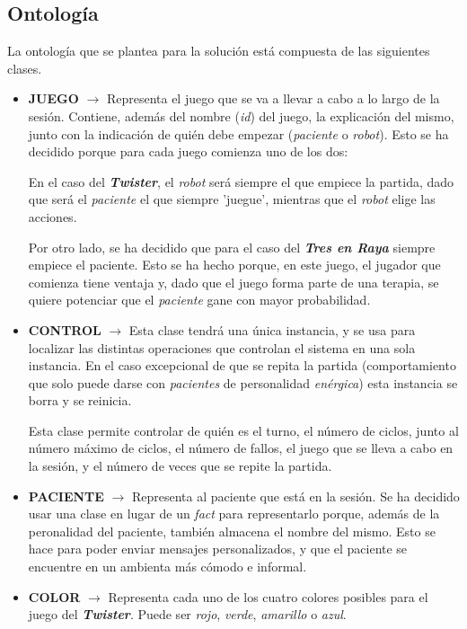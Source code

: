 \documentclass{uc3mpracticas}
\begin{document}
  \subsection{Ontología}

  La ontología que se plantea para la solución está compuesta de las siguientes clases.

  \begin{itemize}
    \item \textbf{JUEGO} $\rightarrow$ Representa el juego que se va a llevar a cabo a lo largo de la sesión. Contiene, además del nombre (\textit{id}) del juego, la explicación del mismo, junto con la indicación de quién debe empezar (\textit{paciente} o \textit{robot}). Esto se ha decidido porque para cada juego comienza uno de los dos:

    \vspace{1mm}

    En el caso del \textbf{\textit{Twister}}, el \textit{robot} será siempre el que empiece la partida, dado que será el \textit{paciente} el que siempre 'juegue', mientras que el \textit{robot} elige las acciones.

    \vspace{2mm}

    Por otro lado, se ha decidido que para el caso del \textit{\textbf{Tres en Raya}} siempre empiece el paciente. Esto se ha hecho porque, en este juego, el jugador que comienza tiene ventaja y, dado que el juego forma parte de una terapia, se quiere potenciar que el \textit{paciente} gane con mayor probabilidad.

    \item \textbf{CONTROL} $\rightarrow$ Esta clase tendrá una única instancia, y se usa para localizar las distintas operaciones que controlan el sistema en una sola instancia. En el caso excepcional de que se repita la partida (comportamiento que solo puede darse con \textit{pacientes} de personalidad \textit{enérgica}) esta instancia se borra y se reinicia.

    \vspace{2mm}

    Esta clase permite controlar de quién es el turno, el número de ciclos, junto al número máximo de ciclos, el número de fallos, el juego que se lleva a cabo en la sesión, y el número de veces que se repite la partida.

    \item \textbf{PACIENTE} $\rightarrow$ Representa al paciente que está en la sesión. Se ha decidido usar una clase en lugar de un \textit{fact} para representarlo porque, además de la peronalidad del paciente, también almacena el nombre del mismo. Esto se hace para poder enviar mensajes personalizados, y que el paciente se encuentre en un ambienta más cómodo e informal.
    \item \textbf{COLOR} $\rightarrow$ Representa cada uno de los cuatro colores posibles para el juego del \textbf{\textit{Twister}}. Puede ser \textit{rojo}, \textit{verde}, \textit{amarillo} o \textit{azul}.


\end{itemize}
\end{document}
